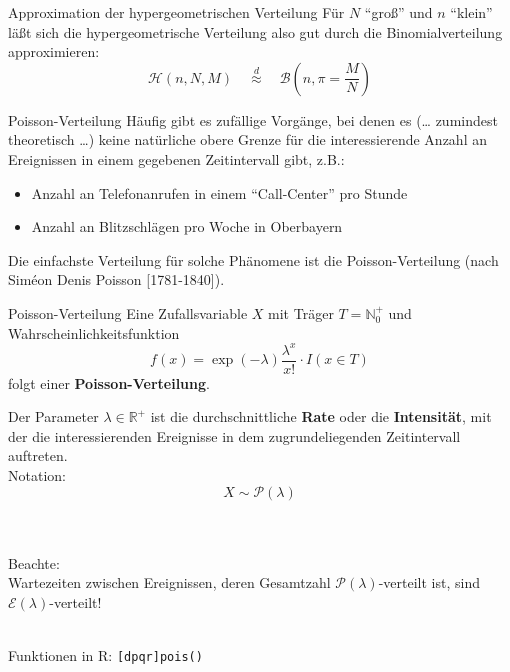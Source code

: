 \documentclass[
  10pt,
  ignorenonframetext,
]{beamer}
\providecommand{\tightlist}{%
  \setlength{\itemsep}{0pt}\setlength{\parskip}{0pt}}
\begin{document}
\begin{frame}{Approximation der hypergeometrischen Verteilung}
\protect\hypertarget{approximation-der-hypergeometrischen-verteilung}{}
Für \(N\) ``groß'' und \(n\) ``klein'' läßt sich die hypergeometrische
Verteilung also gut durch die Binomialverteilung approximieren:\\

\[{\mathcal H}(n, N, M)\quad \stackrel{d}{\approx} \quad {\mathcal B}\left(n, \pi = \frac{M}{N}\right)\]
\end{frame}

\begin{frame}{Poisson-Verteilung}
\protect\hypertarget{poisson-verteilung}{}
Häufig gibt es zufällige Vorgänge, bei denen es (\ldots{} zumindest
theoretisch \ldots) keine natürliche obere Grenze für die
interessierende Anzahl an Ereignissen in einem gegebenen Zeitintervall
gibt, z.B.:

\begin{itemize}
\tightlist
\item
  Anzahl an Telefonanrufen in einem ``Call-Center'' pro Stunde\\
\item
  Anzahl an Blitzschlägen pro Woche in Oberbayern
\end{itemize}

Die einfachste Verteilung für solche Phänomene ist die
Poisson-Verteilung (nach Siméon Denis Poisson {[}1781-1840{]}).
\end{frame}

\begin{frame}[fragile]{Poisson-Verteilung}
\protect\hypertarget{poisson-verteilung-1}{}
Eine Zufallsvariable \(X\) mit Träger \({T} = \mathbb{N}^+_0\) und
Wahrscheinlichkeitsfunktion
\[f(x) =\exp(-\lambda) \frac{\lambda^x}{x!} \cdot I(x \in {T})\] folgt
einer \textbf{Poisson-Verteilung}.

Der Parameter \(\lambda \in \mathbb{R}^+\) ist die durchschnittliche
\textbf{Rate} oder die \textbf{Intensität}, mit der die interessierenden
Ereignisse in dem zugrundeliegenden Zeitintervall auftreten.\\

Notation: \[X \sim {\mathcal P}(\lambda)\]\\
\strut \\

Beachte:\\
Wartezeiten zwischen Ereignissen, deren Gesamtzahl
\(\mathcal P(\lambda)\)-verteilt ist, sind
\(\mathcal{E}(\lambda)\)-verteilt!\\
\strut \\

Funktionen in R: \texttt{{[}dpqr{]}pois()}
\end{frame}
\end{document}
